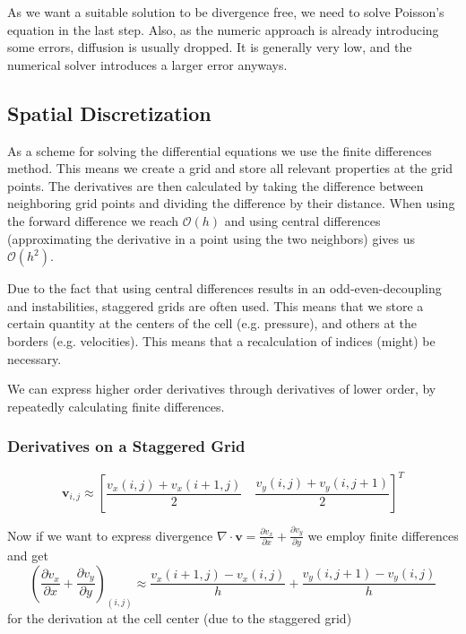 \documentclass{article}
\begin{document}
As we want a suitable solution to be divergence free, we need to solve Poisson's equation in the last step.
Also, as the numeric approach is already introducing some errors, diffusion is usually dropped.
It is generally very low, and the numerical solver introduces a larger error anyways.

\subsection{Spatial Discretization}
As a scheme for solving the differential equations we use the finite differences method.
This means we create a grid and store all relevant properties at the grid points.
The derivatives are then calculated by taking the difference between neighboring grid points and dividing the difference by their distance.
When using the forward difference we reach $\mathcal{O}(h)$ and using central differences (approximating the derivative in a point using the two neighbors) gives us $\mathcal{O}(h^2)$.

Due to the fact that using central differences results in an odd-even-decoupling and instabilities, staggered grids are often used.
This means that we store a certain quantity at the centers of the cell (e.g. pressure), and others at the borders (e.g. velocities).
This means that a recalculation of indices (might) be necessary.

We can express higher order derivatives through derivatives of lower order, by repeatedly calculating finite differences.

\subsubsection{Derivatives on a Staggered Grid}
\begin{equation}
    \bm{v}_{i,j} \approx \left[ \frac{v_x(i,j) + v_x(i+1,j)}{2} \quad \frac{v_y(i,j) + v_y(i, j+1)}{2} \right]^T
\end{equation}

Now if we want to express divergence $\nabla \cdot \bm{v} = \frac{\partial v_x}{\partial x} + \frac{\partial v_y}{\partial y}$ we employ finite differences and get
\begin{equation}
    (\frac{\partial v_x}{\partial x} + \frac{\partial v_y}{\partial y})_{(i,j)} \approx \frac{v_x(i+1, j) - v_x(i,j)}{h} + \frac{v_y(i, j+1) - v_y(i,j)}{h}
\end{equation}
for the derivation at the cell center (due to the staggered grid)
\end{document}
